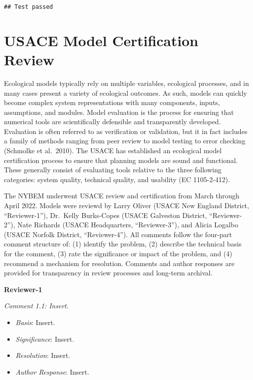 \documentclass[
]{book}
\providecommand{\tightlist}{%
  \setlength{\itemsep}{0pt}\setlength{\parskip}{0pt}}
\begin{document}
\begin{verbatim}
## Test passed
\end{verbatim}

\hypertarget{usace-model-certification-review}{%
\chapter{USACE Model Certification Review}\label{usace-model-certification-review}}

Ecological models typically rely on multiple variables, ecological processes, and in many cases present a variety of ecological outcomes. As such, models can quickly become complex system representations with many components, inputs, assumptions, and modules. Model evaluation is the process for ensuring that numerical tools are scientifically defensible and transparently developed. Evaluation is often referred to as verification or validation, but it in fact includes a family of methods ranging from peer review to model testing to error checking (Schmolke et al.~2010). The USACE has established an ecological model certification process to ensure that planning models are sound and functional. These generally consist of evaluating tools relative to the three following categories: system quality, technical quality, and usability (EC 1105-2-412).

The NYBEM underwent USACE review and certification from March through April 2022. Models were reviewd by Larry Oliver (USACE New England District, ``Reviewer-1''), Dr.~Kelly Burks-Copes (USACE Galveston District, ``Reviewer-2''), Nate Richards (USACE Headquarters, ``Reviewer-3''), and Alicia Logalbo (USACE Norfolk District, ``Reviewer-4''). All comments follow the four-part comment structure of: (1) identify the problem, (2) describe the technical basis for the comment, (3) rate the significance or impact of the problem, and (4) recommend a mechanism for resolution. Comments and author responses are provided for transparency in review processes and long-term archival.

\textbf{Reviewer-1}

\emph{Comment 1.1: Insert.}

\begin{itemize}
\tightlist
\item
  \emph{Basis}: Insert.\\
\item
  \emph{Significance}: Insert.\\
\item
  \emph{Resolution}: Insert.\\
\item
  \emph{Author Response}: Insert.
\end{itemize}
\end{document}
